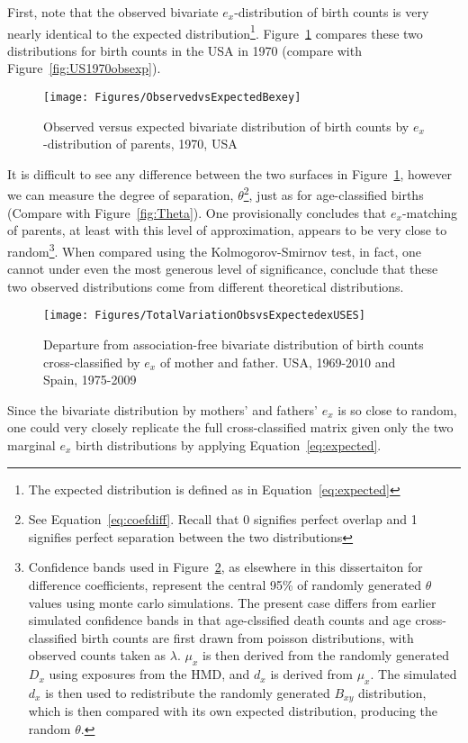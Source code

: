  \FloatBarrier
\label{sec:exobsexpected}
First, note that the observed bivariate $e_x$-distribution of birth counts is
very nearly identical to the expected distribution\footnote{The expected
distribution is defined as in Equation~\eqref{eq:expected}}.
Figure~\ref{fig:US1970obsexpex} compares these two distributions for birth 
counts in the USA in 1970 (compare with Figure~\ref{fig:US1970obsexp}). 

\begin{figure}[ht!]
        \centering  
          \caption{Observed versus expected bivariate distribution of birth
          counts by $e_x$-distribution of parents, 1970, USA}
           \texttt{[image: Figures/ObservedvsExpectedBexey]}
          \label{fig:US1970obsexpex}
\end{figure}

It is
difficult to see any difference between the two surfaces in
Figure~\ref{fig:US1970obsexpex}, however we can measure the degree of
separation, $\theta$\footnote{See Equation~\eqref{eq:coefdiff}. Recall that 0 signifies
perfect overlap and 1 signifies perfect separation between the two
distributions}, just as for age-classified births (Compare with
Figure~\ref{fig:Theta}). One provisionally concludes that $e_x$-matching of
parents, at least with this level of approximation, appears to be very close to
random\footnote{Confidence bands used in Figure~\ref{fig:TotalVarobsexpex}, as
elsewhere in this dissertaiton for difference coefficients, represent the
central 95\% of randomly generated $\theta$ values using monte carlo
simulations. The present case differs from earlier simulated confidence bands in
that age-clssified death counts and age cross-classified birth counts 
are first drawn from poisson distributions, with
observed counts taken as $\lambda$. $\mu_x$ is then derived from the randomly
generated $D_x$ using exposures from the HMD, and $d_x$ is derived from $\mu_x$.
The simulated $d_x$ is then used to redistribute the randomly generated
$B_{xy}$ distribution, which is then compared with its own expected
distribution, producing the random $\theta$.}. When compared using the
Kolmogorov-Smirnov test, in fact, one cannot under even the most generous level
of significance, conclude that these two observed distributions come from
different theoretical distributions.

\begin{figure}[ht!]
        \centering  
          \caption{Departure from association-free bivariate distribution of
          birth counts cross-classified by $e_x$ of mother and father. USA,
          1969-2010 and Spain, 1975-2009}
           \texttt{[image: Figures/TotalVariationObsvsExpectedexUSES]}
          \label{fig:TotalVarobsexpex}
\end{figure}

Since the bivariate distribution by mothers' and fathers' $e_x$ is so close
to random, one could very closely replicate the full cross-classified matrix 
given only the two marginal
$e_x$ birth distributions by applying Equation~\eqref{eq:expected}. 

\FloatBarrier